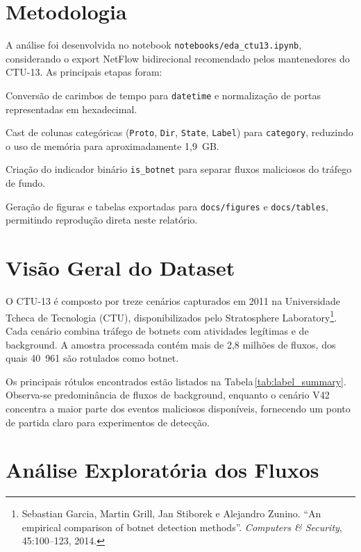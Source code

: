 \documentclass[a4paper, 12pt]{article}
\begin{document}
\section{Metodologia}
A análise foi desenvolvida no notebook \texttt{notebooks/eda\_ctu13.ipynb}, considerando o export NetFlow bidirecional recomendado pelos mantenedores do CTU-13. As principais etapas foram:
\begin{compactitem}
    \item Conversão de carimbos de tempo para \texttt{datetime} e normalização de portas representadas em hexadecimal.
    \item Cast de colunas categóricas (\texttt{Proto}, \texttt{Dir}, \texttt{State}, \texttt{Label}) para \texttt{category}, reduzindo o uso de memória para aproximadamente 1{,}9~GB.
    \item Criação do indicador binário \texttt{is\_botnet} para separar fluxos maliciosos do tráfego de fundo.
    \item Geração de figuras e tabelas exportadas para \texttt{docs/figures} e \texttt{docs/tables}, permitindo reprodução direta neste relatório.
\end{compactitem}

\section{Visão Geral do Dataset}
O CTU-13 é composto por treze cenários capturados em 2011 na Universidade Tcheca de Tecnologia (CTU), disponibilizados pelo Stratosphere Laboratory\footnote{Sebastian Garcia, Martin Grill, Jan Stiborek e Alejandro Zunino. ``An empirical comparison of botnet detection methods''. \textit{Computers \& Security}, 45:100--123, 2014.}. Cada cenário combina tráfego de botnets com atividades legítimas e de background. A amostra processada contém mais de 2,8 milhões de fluxos, dos quais 40~961 são rotulados como botnet.

Os principais rótulos encontrados estão listados na Tabela\,\ref{tab:label_summary}. Observa-se predominância de fluxos de background, enquanto o cenário V42 concentra a maior parte dos eventos maliciosos disponíveis, fornecendo um ponto de partida claro para experimentos de detecção.



\section{Análise Exploratória dos Fluxos}
\end{document}
